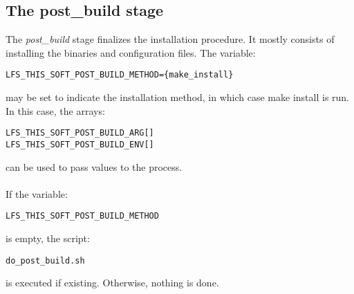 \documentclass[a4paper, 11pt]{article}
\begin{document}
\subsection{The post\_build stage}
The \textit{post\_build} stage finalizes the installation procedure. It mostly
consists of installing the binaries and configuration files. The variable:\\

\begin{lstlisting}[frame=tb]
LFS_THIS_SOFT_POST_BUILD_METHOD={make_install}
\end{lstlisting}
may be set to indicate the installation method, in which case make install is
run. In this case, the arrays:\\

\begin{lstlisting}[frame=tb]
LFS_THIS_SOFT_POST_BUILD_ARG[]
LFS_THIS_SOFT_POST_BUILD_ENV[]
\end{lstlisting}
can be used to pass values to the process.

\paragraph{}
If the variable:\\

\begin{lstlisting}[frame=tb]
LFS_THIS_SOFT_POST_BUILD_METHOD
\end{lstlisting}
is empty, the script:\\

\begin{lstlisting}[frame=tb]
do_post_build.sh
\end{lstlisting}
is executed if existing. Otherwise, nothing is done.
\end{document}
